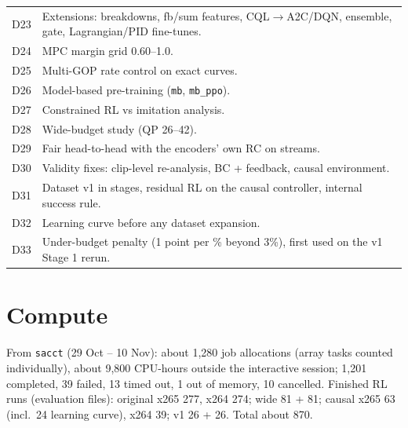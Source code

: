 \documentclass[10pt,a4paper]{article}
\newcommand{\code}[1]{\texttt{\small #1}}
\begin{document}
\begin{longtable}{p{1cm}p{15.4cm}}
D23 & Extensions: breakdowns, fb/sum features, CQL$\to$A2C/DQN, ensemble, gate, Lagrangian/PID fine-tunes. \\
D24 & MPC margin grid 0.60--1.0. \\
D25 & Multi-GOP rate control on exact curves. \\
D26 & Model-based pre-training (\code{mb}, \code{mb\_ppo}). \\
D27 & Constrained RL vs imitation analysis. \\
D28 & Wide-budget study (QP 26--42). \\
D29 & Fair head-to-head with the encoders' own RC on streams. \\
D30 & Validity fixes: clip-level re-analysis, BC + feedback, causal environment. \\
D31 & Dataset v1 in stages, residual RL on the causal controller, internal success rule. \\
D32 & Learning curve before any dataset expansion. \\
D33 & Under-budget penalty (1 point per \% beyond 3\%), first used on the v1 Stage 1 rerun. \\
\bottomrule
\end{longtable}

\section{Compute}
From \code{sacct} (29 Oct -- 10 Nov): about 1,280 job allocations (array tasks counted individually), about 9,800
CPU-hours outside the interactive session; 1,201 completed, 39 failed, 13 timed out, 1 out of memory, 10 cancelled.
Finished RL runs (evaluation files): original x265 277, x264 274; wide 81 + 81; causal x265 63 (incl.\ 24 learning
curve), x264 39; v1 26 + 26. Total about 870.

\end{document}
